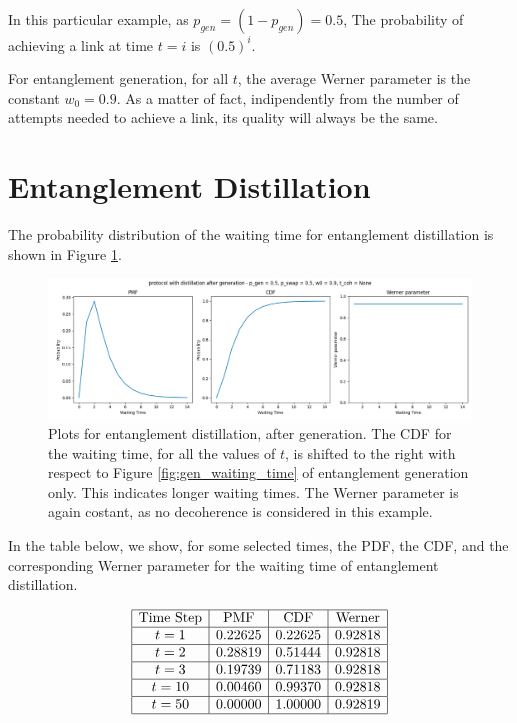 \documentclass{masterthesis}
\begin{document}
In this particular example, as $p_{gen} = (1 - p_{gen}) = 0.5$, The probability of achieving a link at time $t = i$ is $(0.5)^i$.

For entanglement generation, for all $t$, the average Werner parameter is the constant $w_0 = 0.9$. As a matter of fact, indipendently from the number of attempts needed to achieve a link, its quality will always be the same.

\section*{Entanglement Distillation}

The probability distribution of the waiting time for entanglement distillation is shown in Figure \ref{fig:dist_waiting_time}.

\begin{figure}[ht]
    \centering
    \includegraphics[width=1\linewidth]{images/dist_tests/distillation after generation.png}
    \caption{Plots for entanglement distillation, after generation. The CDF for the waiting time, for all the values of $t$, is shifted to the right with respect to Figure \ref{fig:gen_waiting_time} of entanglement generation only. This indicates longer waiting times. The Werner parameter is again costant, as no decoherence is considered in this example.}
    \label{fig:dist_waiting_time}
\end{figure}

In the table below, we show, for some selected times, the PDF, the CDF, and the corresponding Werner parameter for the waiting time of entanglement distillation.

\begin{equation*}
    \begin{array}{|c|c|c|c|}
        \hline
        \text{Time Step} & \text{PMF} & \text{CDF} & \text{Werner} \\
        \hline
        t = 1 & 0.22625 & 0.22625 & 0.92818 \\
        \hline
        t = 2 & 0.28819 & 0.51444 & 0.92818 \\
        \hline
        t = 3 & 0.19739 & 0.71183 & 0.92818 \\
        \hline
        t = 10 & 0.00460 & 0.99370 & 0.92818 \\
        \hline
        t = 50 & 0.00000 & 1.00000 & 0.92819 \\
        \hline
    \end{array}
\end{equation*}
\end{document}
